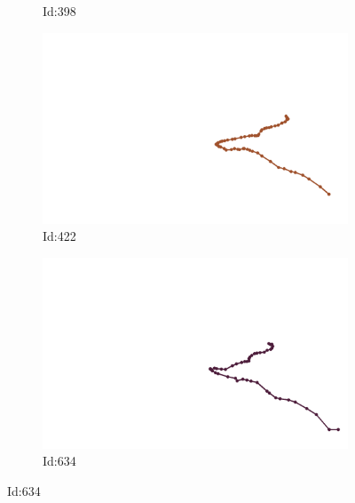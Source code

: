 \documentclass[12pt,twoside]{report}
\begin{document}
\begin{figure}
\begin{subfigure}[b]{0.20\textwidth}
\caption{Id:398}
\end{subfigure}
\begin{subfigure}[b]{0.20\textwidth}
\centering
\includegraphics[width=\textwidth]{../../trajectories/422.png}
\caption{Id:422}
\end{subfigure}
\begin{subfigure}[b]{0.20\textwidth}
\centering
\includegraphics[width=\textwidth]{../../trajectories/634.png}
\caption{Id:634}
\end{subfigure}
\end{figure}
\end{document}
